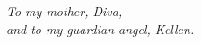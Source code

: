 \documentclass[
thesis.tex
]{subfiles}
\begin{document}
	\newpage
	\null

	\vspace{6cm}

	\begin{center}
		\textit{
		To my mother, Diva, \\
		and to my guardian angel, Kellen.}
	\end{center}


	\begin{flushright}
		
		
	\end{flushright}
	
	\vspace{6cm}
	
	\thispagestyle{empty}	
\end{document}
